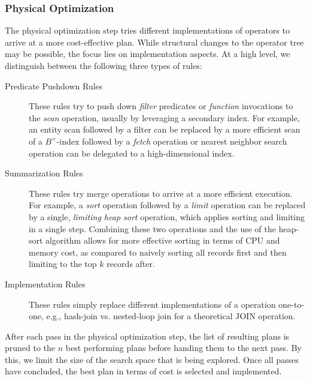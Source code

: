 \subsubsection{Physical Optimization}

The physical optimization step tries different implementations of operators to arrive at a more cost-effective plan. While structural changes to the operator tree may be possible, the focus lies on implementation aspects.  At a high level, we distinguish between the following three types of rules:

\begin{description}
    \item[Predicate Pushdown Rules] These rules try to push down \emph{filter} predicates or \emph{function} invocations to the \emph{scan} operation, usually by leveraging a secondary index. For example, an entity scan followed by a filter can be replaced by a more efficient scan of a $B^+$-index followed by a \emph{fetch} operation or nearest neighbor search operation can be delegated to a high-dimensional index.
 
    \item[Summarization Rules] These rules try merge operations to arrive at a more efficient execution. For example, a \emph{sort} operation followed by a \emph{limit} operation can be replaced by a single, \emph{limiting heap sort} operation, which applies sorting and limiting in a single step. Combining these two operations and the use of the heap-sort algorithm allows for more effective sorting in terms of CPU and memory cost, as compared to naively sorting all records first and then limiting to the top $k$ records after.
    
    \item[Implementation Rules] These rules simply replace different implementations of a operation one-to-one, e.g., hash-join vs. nested-loop join for a theoretical JOIN operation.
\end{description}

After each pass in the physical optimization step, the list of resulting plans is pruned to the $n$ best performing plans before handing them to the next pass. By this, we limit the size of the search space that is being explored. Once all passes have concluded, the best plan in terms of cost is selected and implemented.

